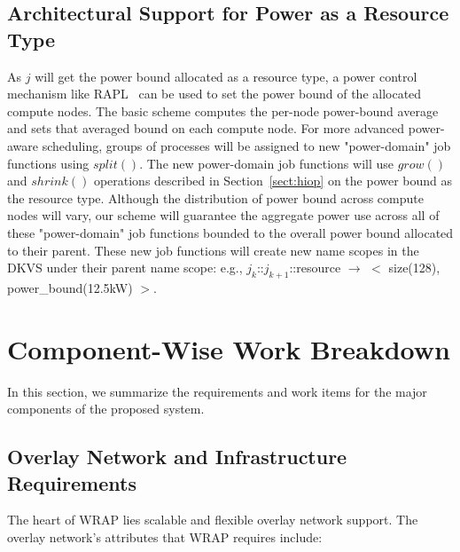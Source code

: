 \documentclass[10pt]{article}
\begin{document}
\subsection{Architectural Support for Power as a Resource Type} 
As $j$ will get the power bound allocated as a resource type, 
a power control mechanism like RAPL~\cite{RountreeRAPL} can be used 
to set the power bound of the allocated compute nodes. 
The basic scheme computes the per-node power-bound average 
and sets that averaged bound on each compute node.
For more advanced power-aware scheduling, groups of processes will
be assigned to new "power-domain" job functions using $split()$. 
The new power-domain job functions will use $grow()$ and $shrink()$ 
operations described in Section~\ref{sect:hiop} 
on the power bound as the resource type.
Although the distribution of power bound across compute
nodes will vary, our scheme will guarantee the aggregate power use 
across all of these "power-domain" job functions bounded to the overall power bound 
allocated to their parent. 
These new job functions will create new name scopes 
in the DKVS under their parent name scope: 
e.g., $j_k$::$j_{k+1}$::resource $\rightarrow$ $<$ size(128), power\_bound(12.5kW) $>$.


\section{Component-Wise Work Breakdown}
In this section, we summarize the requirements and work items for 
the major components of the proposed system. 

\subsection{Overlay Network and Infrastructure Requirements}
The heart of WRAP lies scalable and flexible overlay network support. 
The overlay network's attributes that WRAP requires include:  
\end{document}
